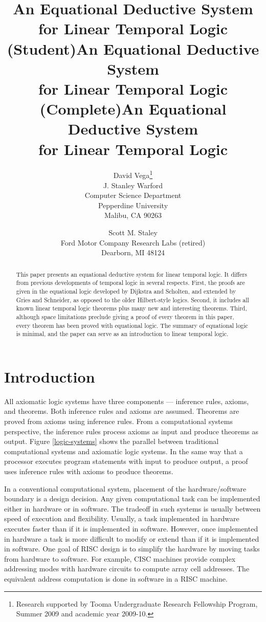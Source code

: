 \documentclass[12pt, fleqn, leqno]{article}
\title{An Equational Deductive System\\for Linear Temporal Logic (Student)}
\title{An Equational Deductive System\\for Linear Temporal Logic (Complete)}
\title{An Equational Deductive System\\for Linear Temporal Logic}
\author{David Vega\thanks{Research supported by Tooma Undergraduate Research Fellowship Program, Summer 2009
        and academic year 2009-10.}\\
   J. Stanley Warford\\
   Computer Science Department\\
   Pepperdine University\\
   Malibu, CA 90263
   \and
   Scott M. Staley\\
   Ford Motor Company Research Labs (retired)\\
   Dearborn, MI 48124}
\date{} %
\begin{document}
\maketitle
\begin{abstract}
This paper presents an equational deductive system for linear temporal logic.
It differs from previous developments of temporal logic in several respects.
First, the proofs are given in the equational logic developed by Dijkstra and Scholten, and extended by Gries and Schneider, as opposed to the older Hilbert-style logics.
Second, it includes all known linear temporal logic theorems plus many new and interesting theorems.
Third, although space limitations preclude giving a proof of every theorem in this paper,
every theorem has been proved with equational logic.
The summary of equational logic is minimal, and the paper can serve as an introduction to linear temporal logic.
\end{abstract}

\thispagestyle{plain}

\section{Introduction}

All axiomatic logic systems have three components --- inference rules, axioms, and theorems.
Both inference rules and axioms are assumed.
Theorems are proved from axioms using inference rules.
From a computational systems perspective, the inference rules process axioms as input and produce theorems as output.
Figure \ref{logic-systems} shows the parallel between traditional computational systems and axiomatic logic systems.
In the same way that a processor executes program statements with input to produce output, a proof uses inference rules with axioms to produce theorems.

In a conventional computational system, placement of the hardware/software boundary is a design decision.
Any given computational task can be implemented either in hardware or in software.
The tradeoff in such systems is usually between speed of execution and flexibility.
Usually, a task implemented in hardware executes faster than if it is implemented in software.
However, once implemented in hardware a task is more difficult to modify or extend than if it is implemented in software.
One goal of RISC design is to simplify the hardware by moving tasks from hardware to software.
For example, CISC machines provide complex addressing modes with hardware circuits to compute array cell addresses.
The equivalent address computation is done in software in a RISC machine.
\end{document}
